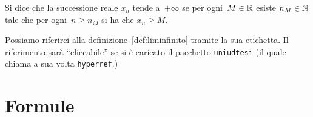 \begin{definizione}\label{def:liminfinito}
Si dice che la successione reale $x_n$ tende a~$+\infty$ se per ogni~$M\in\mathbb{R}$ esiste $n_M\in\mathbb{N}$ tale che per ogni~$n\ge n_M$ si ha che $x_n\ge M$.
\end{definizione}

Possiamo riferirci alla definizione~\ref{def:liminfinito}
tramite la sua etichetta. Il riferimento sarà ``cliccabile'' se si è caricato il pacchetto \verb!uniudtesi! (il quale chiama a sua volta \verb!hyperref!.)

\section{Formule}

